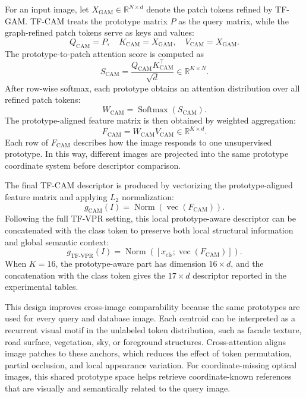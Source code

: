 For an input image, let \(X_{\mathrm{GAM}} \in \mathbb{R}^{N \times d}\) denote the patch tokens refined by TF-GAM. TF-CAM treats the prototype matrix \(P\) as the query matrix, while the graph-refined patch tokens serve as keys and values:
\begin{equation}
  Q_{\mathrm{CAM}} = P, \quad
  K_{\mathrm{CAM}} = X_{\mathrm{GAM}}, \quad
  V_{\mathrm{CAM}} = X_{\mathrm{GAM}}.
\end{equation}
The prototype-to-patch attention score is computed as
\begin{equation}
  S_{\mathrm{CAM}} =
  \frac{Q_{\mathrm{CAM}}K_{\mathrm{CAM}}^{\top}}{\sqrt{d}}
  \in \mathbb{R}^{K \times N}.
\end{equation}
After row-wise softmax, each prototype obtains an attention distribution over all refined patch tokens:
\begin{equation}
  W_{\mathrm{CAM}} = \operatorname{Softmax}(S_{\mathrm{CAM}}).
\end{equation}
The prototype-aligned feature matrix is then obtained by weighted aggregation:
\begin{equation}
  F_{\mathrm{CAM}} = W_{\mathrm{CAM}}V_{\mathrm{CAM}}
  \in \mathbb{R}^{K \times d}.
\end{equation}
Each row of \(F_{\mathrm{CAM}}\) describes how the image responds to one unsupervised prototype. In this way, different images are projected into the same prototype coordinate system before descriptor comparison.

The final TF-CAM descriptor is produced by vectorizing the prototype-aligned feature matrix and applying \(L_2\) normalization:
\begin{equation}
  g_{\mathrm{CAM}}(I) =
  \operatorname{Norm}\left(\operatorname{vec}(F_{\mathrm{CAM}})\right).
\end{equation}
Following the full TF-VPR setting, this local prototype-aware descriptor can be concatenated with the class token to preserve both local structural information and global semantic context:
\begin{equation}
  g_{\mathrm{TF\mbox{-}VPR}}(I) =
  \operatorname{Norm}\left([x_{\mathrm{cls}};\operatorname{vec}(F_{\mathrm{CAM}})]\right).
\end{equation}
When \(K=16\), the prototype-aware part has dimension \(16 \times d\), and the concatenation with the class token gives the \(17 \times d\) descriptor reported in the experimental tables.

This design improves cross-image comparability because the same prototypes are used for every query and database image. Each centroid can be interpreted as a recurrent visual motif in the unlabeled token distribution, such as facade texture, road surface, vegetation, sky, or foreground structures. Cross-attention aligns image patches to these anchors, which reduces the effect of token permutation, partial occlusion, and local appearance variation. For coordinate-missing optical images, this shared prototype space helps retrieve coordinate-known references that are visually and semantically related to the query image.

